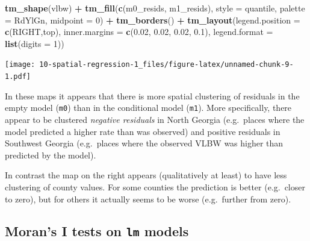 \documentclass[
]{book}
\newenvironment{Shaded}{\begin{snugshade}}{\end{snugshade}}
\newcommand{\AttributeTok}[1]{\textcolor[rgb]{0.13,0.29,0.53}{#1}}
\newcommand{\DecValTok}[1]{\textcolor[rgb]{0.00,0.00,0.81}{#1}}
\newcommand{\FloatTok}[1]{\textcolor[rgb]{0.00,0.00,0.81}{#1}}
\newcommand{\FunctionTok}[1]{\textcolor[rgb]{0.13,0.29,0.53}{\textbf{#1}}}
\newcommand{\NormalTok}[1]{#1}
\newcommand{\SpecialCharTok}[1]{\textcolor[rgb]{0.81,0.36,0.00}{\textbf{#1}}}
\newcommand{\StringTok}[1]{\textcolor[rgb]{0.31,0.60,0.02}{#1}}
\begin{document}
\begin{Shaded}
\begin{Highlighting}[]
\FunctionTok{tm\_shape}\NormalTok{(vlbw) }\SpecialCharTok{+}
  \FunctionTok{tm\_fill}\NormalTok{(}\FunctionTok{c}\NormalTok{(}\StringTok{\textquotesingle{}m0\_resids\textquotesingle{}}\NormalTok{, }\StringTok{\textquotesingle{}m1\_resids\textquotesingle{}}\NormalTok{),}
          \AttributeTok{style =} \StringTok{\textquotesingle{}quantile\textquotesingle{}}\NormalTok{,}
          \AttributeTok{palette =} \StringTok{\textquotesingle{}RdYlGn\textquotesingle{}}\NormalTok{,}
          \AttributeTok{midpoint =} \DecValTok{0}\NormalTok{) }\SpecialCharTok{+}
  \FunctionTok{tm\_borders}\NormalTok{()  }\SpecialCharTok{+}
  \FunctionTok{tm\_layout}\NormalTok{(}\AttributeTok{legend.position =} \FunctionTok{c}\NormalTok{(}\StringTok{\textquotesingle{}RIGHT\textquotesingle{}}\NormalTok{,}\StringTok{\textquotesingle{}top\textquotesingle{}}\NormalTok{),}
            \AttributeTok{inner.margins =} \FunctionTok{c}\NormalTok{(}\FloatTok{0.02}\NormalTok{, }\FloatTok{0.02}\NormalTok{, }\FloatTok{0.02}\NormalTok{, }\FloatTok{0.1}\NormalTok{),}
            \AttributeTok{legend.format =} \FunctionTok{list}\NormalTok{(}\AttributeTok{digits =} \DecValTok{1}\NormalTok{))}
\end{Highlighting}
\end{Shaded}

\texttt{[image: 10-spatial-regression-1\_files/figure-latex/unnamed-chunk-9-1.pdf]}

In these maps it appears that there is more spatial clustering of residuals in the empty model (\texttt{m0}) than in the conditional model (\texttt{m1}). More specifically, there appear to be clustered \emph{negative residuals} in North Georgia (e.g.~places where the model predicted a higher rate than was observed) and positive residuals in Southwest Georgia (e.g.~places where the observed VLBW was higher than predicted by the model).

In contrast the map on the right appears (qualitatively at least) to have less clustering of county values. For some counties the prediction is better (e.g.~closer to zero), but for others it actually seems to be worse (e.g.~further from zero).

\hypertarget{morans-i-tests-on-lm-models}{%
\subsection{\texorpdfstring{Moran's I tests on \texttt{lm} models}{Moran's I tests on lm models}}\label{morans-i-tests-on-lm-models}}
\end{document}
